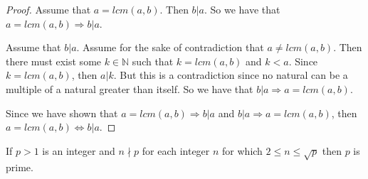 \documentclass[12 pt]{exam}
\begin{document}
\begin{questions}
\begin{solution}
\begin{proof}
  Assume that $a = lcm(a, b)$. Then $b | a$. So we have that $a = lcm(a, b) \Rightarrow b | a$.

  Assume that $b | a$. Assume for the sake of contradiction that $a \ne lcm(a,b)$. Then there must exist some
  $k \in \mathbb{N}$ such that $k = lcm(a, b)$ and $k < a$. Since $k = lcm(a, b)$, then $a | k$.
  But this is a contradiction since no natural can be a multiple of a natural greater than itself.
  So we have that $b | a \Rightarrow a = lcm(a, b)$.

  Since we have shown that $a = lcm(a, b) \Rightarrow b | a$ and $b | a \Rightarrow a = lcm(a,b)$,
  then $a = lcm(a,b) \iff b | a$.
\end{proof}\end{solution}


\question If $p >1$ is an integer and $n \nmid p$ for each integer $n$ for which $2 \leq n \leq \sqrt{p}$ then $p$ is prime. 

\end{questions}
\end{document}
